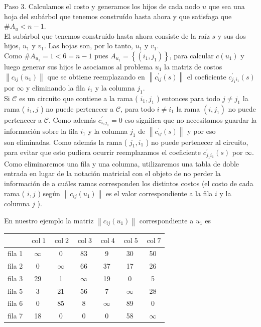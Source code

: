\documentclass[10pt]{article}
\begin{document}
Paso 3. Calculamos el costo y generamos los hijos de cada nodo $u$ que sea una hoja del subárbol que tenemos construído hasta ahora y que satisfaga que $\# A_{u}<n-1$.\\
El subárbol que tenemos construído hasta ahora consiste de la raíz $s$ y sus dos hijos, $u_{1}$ y $v_{1}$. Las hojas son, por lo tanto, $u_{1}$ y $v_{1}$.\\
Como $\# A_{u_{1}}=1<6=n-1$ pues $A_{u_{1}}=\left\{\left(i_{1}, j_{1}\right)\right\}$, para calcular $c\left(u_{1}\right)$ y luego generar sus hijos le asociamos al problema $u_{1}$ la matriz de costos $\left\|c_{i j}\left(u_{1}\right)\right\|$ que se obtiene reemplazando en $\left\|c_{i j}^{\prime}(s)\right\|$ el coeficiente $c_{j_{1} i_{1}}^{\prime}(s)$ por $\infty$ y eliminando la fila $i_{1}$ y la columna $j_{1}$.\\
Si $\mathcal{C}$ es un circuito que contiene a la rama ( $i_{1}, j_{1}$ ) entonces para todo $j \neq j_{1}$ la rama ( $i_{1}, j$ ) no puede pertenecer a $\mathcal{C}$, para todo $i \neq i_{1}$ la rama $\left(i, j_{1}\right)$ no puede pertenecer a $\mathcal{C}$. Como además $c_{i_{1} j_{1}}^{\prime}=0$ eso significa que no necesitamos guardar la información sobre la fila $i_{1}$ y la columna $j_{1}$ de $\left\|c_{i j}^{\prime}(s)\right\|$ y por eso\\
son eliminadas. Como además la rama ( $j_{1}, i_{1}$ ) no puede pertenecer al circuito, para evitar que esto pudiera ocurrir reemplazamos el coeficiente $c_{j_{1} i_{1}}^{\prime}(s)$ por $\infty$.\\
Como eliminaremos una fila y una columna, utilizaremos una tabla de doble entrada en lugar de la notación matricial con el objeto de no perder la información de a cuáles ramas corresponden los distintos costos (el costo de cada rama ( $i, j$ ) según $\left\|c_{i j}\left(u_{1}\right)\right\|$ es el valor correspondiente a la fila $i$ y la columna $j$ ).

En nuestro ejemplo la matriz $\left\|c_{i j}\left(u_{1}\right)\right\|$ correspondiente a $u_{1}$ es

\begin{center}
\begin{tabular}{|c|c|c|c|c|c|c|}
\hline
 & $\operatorname{col} 1$ & $\operatorname{col} 2$ & $\operatorname{col} 3$ & $\operatorname{col} 4$ & $\operatorname{col} 5$ & $\operatorname{col} 7$ \\
\hline
fila 1 & $\infty$ & 0 & 83 & 9 & 30 & 50 \\
\hline
fila 2 & 0 & $\infty$ & 66 & 37 & 17 & 26 \\
\hline
fila 3 & 29 & 1 & $\infty$ & 19 & 0 & 5 \\
\hline
fila 5 & 3 & 21 & 56 & 7 & $\infty$ & 28 \\
\hline
fila 6 & 0 & 85 & 8 & $\infty$ & 89 & 0 \\
\hline
fila 7 & 18 & 0 & 0 & 0 & 58 & $\infty$ \\
\hline
\end{tabular}
\end{center}
\end{document}
